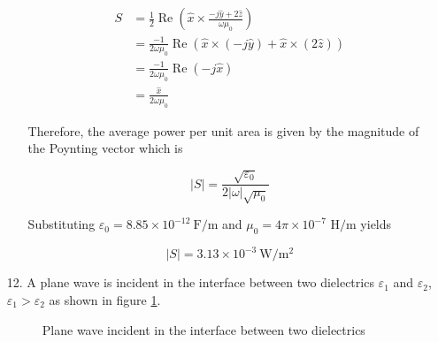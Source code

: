 \documentclass[main.tex]{subfiles}
\begin{document}
\begin{enumerate}
\begin{enumerate}
        $$
        \begin{aligned}
        S &= \frac{1}{2} \operatorname{Re}\left(\hat{x} \times \frac{-j \hat{y}+2 \hat{z}}{\omega \mu_0}\right) \\
        &= \frac{-1}{2 \omega \mu_0} \operatorname{Re}(\hat{x} \times(-j \hat{y})+\hat{x} \times(2 \hat{z})) \\
        &= \frac{-1}{2 \omega \mu_0} \operatorname{Re}(-j \hat{x}) \\
        &= \frac{\hat{x}}{2 \omega \mu_0}
        \end{aligned}
        $$
        
        Therefore, the average power per unit area is given by the magnitude of the Poynting vector which is
        
        $$
        |S|=\frac{\sqrt{\varepsilon_0}}{2|\omega| \sqrt{\mu_0}}
        $$
        
        Substituting $\varepsilon_0=8.85 \times 10^{-12} \mathrm{~F} / \mathrm{m}$ and $\mu_0=4 \pi \times 10^{-7}$ $\mathrm{H} / \mathrm{m}$ yields
        
        $$
        |S|=3.13 \times 10^{-3} \mathrm{~W} / \mathrm{m}^2
        $$
        
    \end{enumerate}

\item [12.] A plane wave is incident in the interface between two dielectrics $\varepsilon_1$ and $\varepsilon_2$, $\varepsilon_1 > \varepsilon_2$ as shown in figure \ref{fig:12q_a}.

\begin{figure}
\centering{}
\caption{Plane wave incident in the interface between two dielectrics}
\label{fig:12q_a}
\end{figure}


\end{enumerate}
\end{document}
